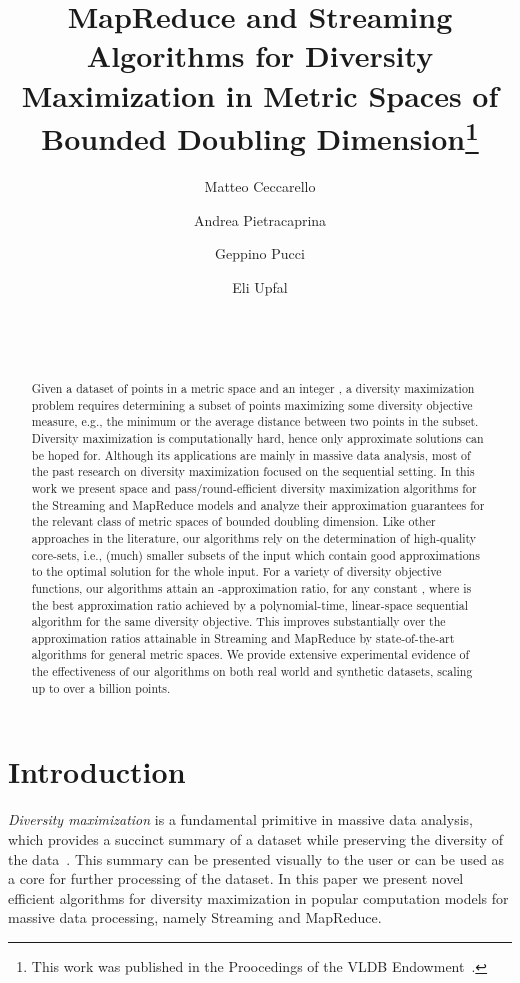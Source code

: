 \documentclass{article}
\title{
  MapReduce and Streaming Algorithms for Diversity Maximization in 
  Metric Spaces of Bounded Doubling Dimension\footnote{This work was published in the Proocedings of the VLDB Endowment~\cite{CeccarelloPPU17}.}
}
\date{}
\author{
  Matteo Ceccarello\and
  Andrea Pietracaprina \and
  Geppino Pucci\and
  Eli Upfal
  \\
  \affaddr{Department of Information Engineering, University of Padova,
    Padova, Italy}\\
  \email{\{ceccarel,capri,geppo\}@dei.unipd.it}
  \\
  \affaddr{Department of Computer Science,
    Brown University, Providence, RI USA}\\
  \email{eli\_upfal@brown.edu}
}
\begin{document}
\maketitle

\begin{abstract}
Given a dataset of points in a metric space and an integer , a
diversity maximization problem requires determining a subset of 
points maximizing some diversity objective measure, e.g., the minimum
or the average distance between two points in the subset.
Diversity maximization is computationally hard, hence only approximate
solutions can be hoped for. Although its applications are mainly in
massive data analysis, most of the past research on diversity
maximization focused on the sequential setting.  In
this work we present space and pass/round-efficient 
diversity maximization algorithms for the
Streaming and MapReduce models and analyze their approximation
guarantees for the relevant class of metric spaces of bounded doubling
dimension. Like other approaches in the literature, our algorithms
rely on the determination of high-quality core-sets, i.e.,
(much) smaller subsets of the input which contain good approximations
to the optimal solution for the whole input. For a variety of
diversity objective functions, our algorithms attain an
-approximation ratio, for any constant
, where  is the best approximation ratio achieved
by a polynomial-time, linear-space sequential algorithm for the same
diversity objective.  This improves substantially  over
the approximation ratios attainable in Streaming and MapReduce
by state-of-the-art algorithms for general metric
spaces. We provide extensive experimental evidence of the
effectiveness of our algorithms on both
real world and synthetic datasets, scaling up to over a
billion points.
\end{abstract}

\section{Introduction}

\emph{Diversity maximization} is a fundamental primitive in massive
data analysis, which provides a succinct summary 
of a dataset while preserving the diversity of the
data~\cite{AbbassiMT13,MasinB08,wu2013,YangMNFCH15}. This summary can be presented visually to the user or can be used as a core for further processing of the dataset. In this paper we present novel efficient algorithms for diversity
maximization in popular computation models for massive data processing,
namely Streaming and MapReduce.
\end{document}
